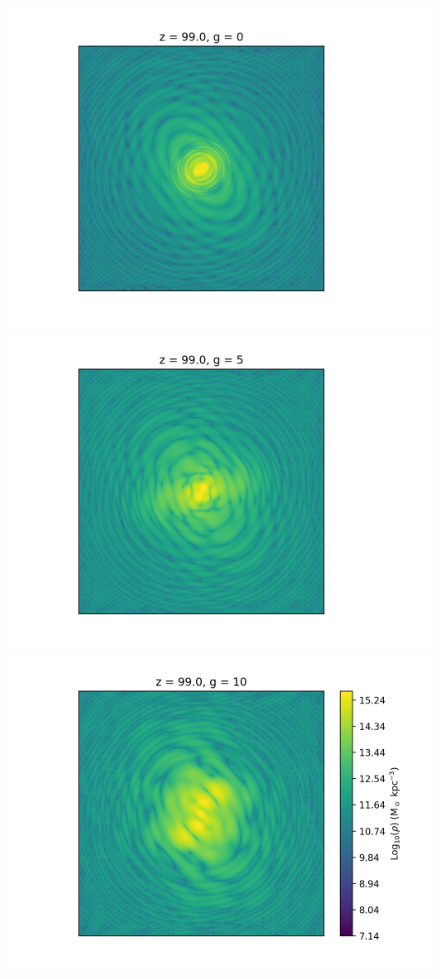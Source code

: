 \documentclass[a4paper,11pt]{article}
\begin{document}
\begin{figure}[!htb]
  \includegraphics[trim={3cm 0 1cm 0cm},scale=0.52]{z_99_0_0.png}
\endminipage\hfill
{}
  \includegraphics[trim={3.5cm 0 1cm 0cm},scale=0.52]{z_99_0_5.png}
\endminipage\hfill
{}
  \includegraphics[trim={4.0cm 0 0cm 0cm},scale=0.52]{z_99_0_10.png}

\end{figure}
\end{document}
